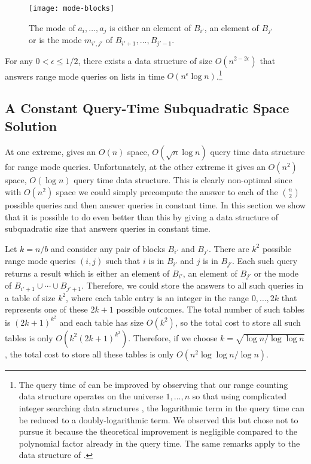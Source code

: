 \documentclass{njcarticle}
\begin{document}
\begin{figure}
\begin{center}\texttt{[image: mode-blocks]}\end{center}
\caption{The mode of $a_i,\ldots,a_j$ is either an element of $B_{i'}$,
an element of $B_{j'}$ or is the mode $m_{i',j'}$ of $B_{i'+1},\ldots,B_{j'-1}$.}
\end{figure}

\begin{theorem} For any $0<\epsilon\le 1/2$, there exists a
data structure of size $O(n^{2-2\epsilon})$ that answers range mode
queries on lists in time $O(n^\epsilon\log n)$.\footnote{The query
time of  can be improved by observing that our
range counting data structure operates on the universe $1,\ldots,n$ so
that using complicated integer searching data structures
, the logarithmic term in the query time can be
reduced to a doubly-logarithmic term.  We observed this but chose not
to pursue it because the theoretical improvement is negligible
compared to the polynomial factor already in the query time. The same
remarks apply to the data structure of .}
\end{theorem}


\subsection{A Constant Query-Time Subquadratic Space Solution}

At one extreme,  gives an $O(n)$ space,
$O(\sqrt{n}\log n)$ query time data structure for range mode queries.
Unfortunately, at the other extreme it gives an $O(n^2)$ space,
$O(\log n)$ query time data structure.  This is clearly non-optimal
since with $O(n^2)$ space we could simply precompute the answer to
each of the $n\choose 2$ possible queries and then answer queries in
constant time.  In this section we show that it is possible to do even
better than this by giving a data structure of subquadratic size that
answers queries in constant time.

Let $k=n/b$ and consider any pair of blocks $B_{i'}$ and $B_{j'}$.
There are $k^2$ possible range mode queries $(i,j)$ such that $i$ is
in $B_{i'}$ and $j$ is in $B_{j'}$. Each such query returns a result
which is either an element of $B_{i'}$, an element of $B_{j'}$ or the
mode of $B_{i'+1}\cup\cdots\cup B_{j'+1}$. Therefore, we could store
the answers to all such queries in a table of size $k^2$, where each
table entry is an integer in the range $0,\ldots,2k$ that represents
one of these $2k+1$ possible outcomes.  The total number of such
tables is $(2k+1)^{k^2}$ and each table has size $O(k^2)$, so the
total cost to store all such tables is only $O(k^2(2k+1)^{k^2})$.
Therefore, if we choose $k=\sqrt{\log n/\log\log n}$, the total cost
to store all these tables is only $O(n^2\log\log n/\log n)$.
\end{document}
